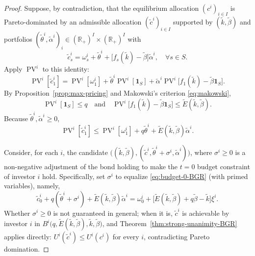 \documentclass[11pt,a4paper,oneside]{book}
\def\R{\mathbb{R}}
\def\1{\mathbf{1}}
\def\leq{\leqslant}
\def\geq{\geqslant}
\def\et{\quad \text{and} \quad}
\DeclareMathOperator{\PV}{PV}
\theoremstyle{plain}
\theoremstyle{definition}
\theoremstyle{remark}
\numberwithin{equation}{chapter}
\begin{document}
\begin{proof}
Suppose, by contradiction, that the equilibrium allocation $(c^i)_{i \in I}$ is Pareto-dominated by an admissible allocation $(\widetilde{c}^i)_{i \in I}$ supported by $(\widetilde{k}, \widetilde{\beta})$ and portfolios $(\widetilde{\theta}^i, \widetilde{\alpha}^i)_i \in (\R_+)^I \times (\R_+)^I$ with
\begin{equation*}
  \widetilde{c}^i_s = \omega^i_s + \widetilde{\theta}^i + \bigl[ f_s(\widetilde{k}) - \widetilde{\beta} \bigr] \widetilde{\alpha}^i, \quad \forall s \in S.
\end{equation*}
Apply $\PV^i$ to this identity:
\begin{equation*}
  \PV^i[\widetilde{c}^i_1]
  = \PV^i[\omega^i_1] + \widetilde{\theta}^i \PV^i[\1_S] + \widetilde{\alpha}^i \PV^i\bigl[ f_1(\widetilde{k}) - \widetilde{\beta} \1_S \bigr].
\end{equation*}
By Proposition~\ref{prop:max-pricing} and Makowski's criterion \eqref{eq:makowski},
\begin{equation*}
  \PV^i[\1_S] \leq q
  \et
  \PV^i\bigl[ f_1(\widetilde{k}) - \widetilde{\beta} \1_S \bigr] \leq \widetilde{E}(\widetilde{k}, \widetilde{\beta}).
\end{equation*}
Because $\widetilde{\theta}^i, \widetilde{\alpha}^i \geq 0$,
\begin{equation}\label{eq:PV-ct}
  \PV^i[\widetilde{c}^i_1] \leq \PV^i[\omega^i_1] + q \widetilde{\theta}^i + \widetilde{E}(\widetilde{k}, \widetilde{\beta}) \widetilde{\alpha}^i.
\end{equation}

Consider, for each $i$, the candidate $\bigl( (\widetilde{k}, \widetilde{\beta}), (\widetilde{c}^i, \widetilde{\theta}^i + \sigma^i, \widetilde{\alpha}^i) \bigr)$, where $\sigma^i \geq 0$ is a non-negative adjustment of the bond holding to make the $t=0$ budget constraint of investor $i$ hold.
Specifically, set $\sigma^i$ to equalize \eqref{eq:budget-0-BGR} (with primed variables), namely,
\begin{equation*}
  \widetilde{c}^i_0 + q (\widetilde{\theta}^i + \sigma^i) + \widetilde{E}(\widetilde{k}, \widetilde{\beta}) \widetilde{\alpha}^i
  =
  \omega^i_0 + \bigl[ \widetilde{E}(\widetilde{k}, \widetilde{\beta}) + q \widetilde{\beta} - \widetilde{k} \bigr] \xi^i.
\end{equation*}
Whether $\sigma^i \geq 0$ is not guaranteed in general; when it is, $\widetilde{c}^i$ is achievable by investor $i$ in $B^i\bigl(q, \widetilde{E}(\widetilde{k}, \widetilde{\beta}), \widetilde{k}, \widetilde{\beta}\bigr)$, and Theorem~\ref{thm:strong-unanimity-BGR} applies directly: $U^i(\widetilde{c}^i) \leq U^i(c^i)$ for every $i$, contradicting Pareto domination.


\end{proof}
\end{document}
